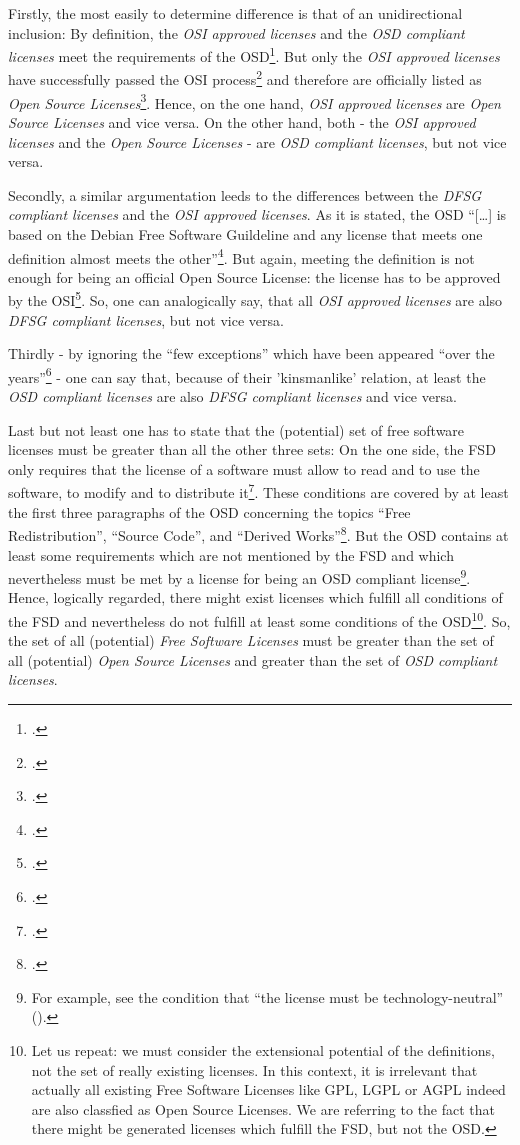 Firstly, the most easily to determine difference is that of an unidirectional
inclusion: By definition, the \emph{OSI approved licenses} and the \emph{OSD
compliant licenses} meet the requirements of the OSD\footcite[cf.][\nopage
wp]{OSI2012a}. But only the \emph{OSI approved licenses} have successfully
passed the OSI process\footcite[cf.][\nopage wp]{OSI2012a} and therefore are
officially listed as \emph{Open Source Licenses}\footcite[cf.][\nopage
wp]{OSI2012b}. Hence, on the one hand, \emph{OSI approved licenses} are
\emph{Open Source Licenses} and vice versa. On the other hand, both - the
\emph{OSI approved licenses} and the \emph{Open Source Licenses} - are \emph{OSD
compliant licenses}, but not vice versa.

Secondly, a similar argumentation leeds to the differences between the
\emph{DFSG compliant licenses} and the \emph{OSI approved licenses}. As it is
stated, the OSD \enquote{[\ldots] is based on the Debian Free Software
Guildeline and any license that meets one definition almost meets the
other}\footcite[cf.][233]{Fogel2006a}. But again, meeting the definition is not
enough for being an official Open Source License: the license has to be approved
by the OSI\footcite[cf.][\nopage wp]{OSI2012b}. So, one can analogically say,
that all \emph{OSI approved licenses} are also \emph{DFSG compliant licenses},
but not vice versa.

Thirdly - by ignoring the \enquote{few exceptions} which have been appeared
\enquote{over the years}\footcite[cf.][233]{Fogel2006a} - one can say that,
because of their 'kinsmanlike' relation, at least the \emph{OSD compliant
licenses} are also \emph{DFSG compliant licenses} and vice versa.

Last but not least one has to state that the (potential) set of free software
licenses must be greater than all the other three sets: On the one side, the FSD
only requires that the license of a software must allow to read and to use the
software, to modify and to distribute it\footcite[cf.][41]{Stallman1996a}. These
conditions are covered by at least the first three paragraphs of the OSD
concerning the topics \enquote{Free Redistribution}, \enquote{Source Code}, and
\enquote{Derived Works}\footcite[cf.][\nopage wp]{OSI2012a}. But the OSD
contains at least some requirements which are not mentioned by the FSD and
which nevertheless must be met by a license for being an OSD compliant
license\footnote{For example, see the condition that \enquote{the license must
be technology-neutral} (\cite[cf.][\nopage wp]{OSI2012a}).}. Hence, logically
regarded, there might exist licenses which fulfill all conditions of the FSD
and nevertheless do not fulfill at least some conditions of the OSD\footnote{
Let us repeat: we must consider the extensional potential of the definitions,
not the set of really existing licenses. In this context, it is irrelevant that
actually all existing Free Software Licenses like GPL, LGPL or AGPL indeed are
also classfied as Open Source Licenses. We are referring to the fact that there
might be generated licenses which fulfill the FSD, but not the OSD.}. So, the
set of all (potential) \emph{Free Software Licenses} must be greater than the
set of all (potential) \emph{Open Source Licenses} and greater than the set of
\emph{OSD compliant licenses}.

